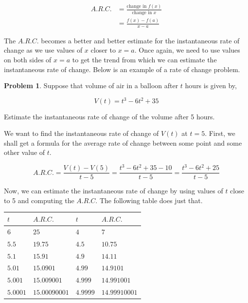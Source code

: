 \documentclass[12pt]{article}
\theoremstyle{definition}
\newtheorem{problem}{Problem}
\begin{document}
\begin{align}
    A.R.C. & = \frac{\text{change in } f(x)}{\text{change in } x} \\
           & = \frac{f(x)-f(a)}{x-a}
\end{align}

The $A.R.C.$ becomes a better and better estimate for the instantaneous rate of change as we use values of $x$ closer to $x=a$.
Once again, we need to use values on both sides of $x=a$ to get the trend from which we can estimate the instantaneous rate of change.
Below is an example of a rate of change problem.

\begin{problem}
Suppose that volume of air in a balloon after $t$ hours is given by,

\begin{equation*}
    V(t) = t^3 - 6t^2 + 35 \label{eq:3}
\end{equation*}

Estimate the instantaneous rate of change of the volume after 5 hours.
\end{problem}

We want to find the instantaneous rate of change of $V(t)$ at $t=5$.
First, we shall get a formula for the average rate of change between some point and some other value of $t$.

\begin{equation}
    A.R.C. = \frac{V(t)-V(5)}{t-5} = \frac{t^3-6t^2+35-10}{t-5} = \frac{t^3-6t^2+25}{t-5}
\end{equation}

Now, we can estimate the instantaneous rate of change by using values of $t$ close to 5 and computing the $A.R.C.$
The following table does just that.

\begin{table}[h]
    \renewcommand{\arraystretch}{1.5}
    \centering
    \begin{tabular}{>{\centering\arraybackslash}m{1.5cm}|>{\centering\arraybackslash}m{2.5cm}|>{\centering\arraybackslash}m{1.5cm}|>{\centering\arraybackslash}m{2.5cm}}
        $t$      & $A.R.C.$      & $t$      & $A.R.C.$      \\ \hline
        $6$      & $25$          & $4$      & $7$           \\
        $5.5$    & $19.75$       & $4.5$    & $10.75$       \\
        $5.1$    & $15.91$       & $4.9$    & $14.11$       \\
        $5.01$   & $15.0901$     & $4.99$   & $14.9101$     \\
        $5.001$  & $15.009001$   & $4.999$  & $14.991001$   \\
        $5.0001$ & $15.00090001$ & $4.9999$ & $14.99910001$
    \end{tabular}
\end{table}
\end{document}
